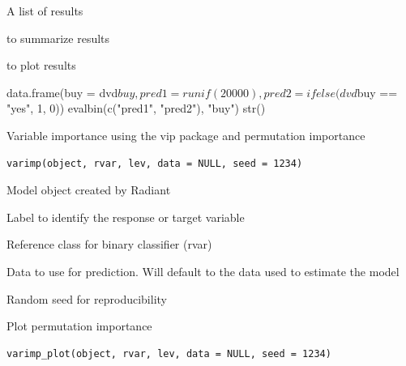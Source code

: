 \documentclass[a4paper]{book}
\begin{document}
%
\begin{Value}
A list of results
\end{Value}
%
\begin{SeeAlso}
 to summarize results

 to plot results
\end{SeeAlso}
%
\begin{Examples}
\begin{ExampleCode}
data.frame(buy = dvd$buy, pred1 = runif(20000), pred2 = ifelse(dvd$buy == "yes", 1, 0)) %
  evalbin(c("pred1", "pred2"), "buy") %
  str()
\end{ExampleCode}
\end{Examples}
%
\begin{Description}
Variable importance using the vip package and permutation importance
\end{Description}
%
\begin{Usage}
\begin{verbatim}
varimp(object, rvar, lev, data = NULL, seed = 1234)
\end{verbatim}
\end{Usage}
%
\begin{Arguments}
\begin{ldescription}
\item[\code{object}] Model object created by Radiant

\item[\code{rvar}] Label to identify the response or target variable

\item[\code{lev}] Reference class for binary classifier (rvar)

\item[\code{data}] Data to use for prediction. Will default to the data used to estimate the model

\item[\code{seed}] Random seed for reproducibility
\end{ldescription}
\end{Arguments}
%
\begin{Description}
Plot permutation importance
\end{Description}
%
\begin{Usage}
\begin{verbatim}
varimp_plot(object, rvar, lev, data = NULL, seed = 1234)
\end{verbatim}
\end{Usage}
\end{document}
